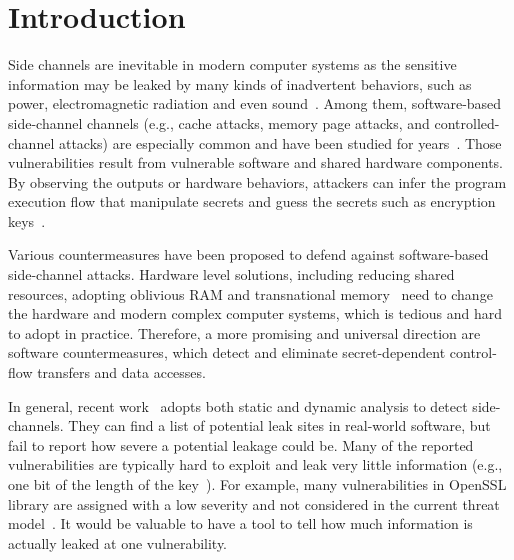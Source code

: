 \section{Introduction}
Side channels are inevitable in modern computer systems as the sensitive information 
may be leaked by many kinds of inadvertent behaviors, 
such as power, electromagnetic radiation and even sound~\cite{}. 
Among them, software-based side-channel channels (e.g., cache attacks, memory page attacks,
and controlled-channel attacks) are especially common 
and have been studied for years~\cite{}. 
Those vulnerabilities result from vulnerable software and shared hardware components.
By observing the outputs or hardware behaviors, attackers can
infer the program execution flow that manipulate secrets and 
guess the secrets such as encryption keys~\cite{}.


Various countermeasures have been proposed to defend against 
software-based side-channel attacks. Hardware level solutions, 
including reducing shared resources, adopting oblivious RAM and 
transnational memory~\cite{182946,203878,217537} need to change the hardware
and modern complex computer systems, which is tedious and hard to adopt in 
practice. Therefore, a more promising and universal direction are software countermeasures, which
detect and eliminate secret-dependent control-flow transfers and data accesses.

In general, recent work~\cite{203878} adopts both static and dynamic analysis
to detect side-channels.
They can find a list of potential leak sites in real-world software, 
but fail to report how severe a potential leakage could be. 
Many of the reported vulnerabilities are typically hard to exploit
and leak very little information (e.g., one bit of the length of the key~\cite{203878}).  
For example, many vulnerabilities in OpenSSL library are assigned with a low severity 
and not considered 
in the current threat model~\cite{https://www.openssl.org/policies/secpolicy.html}. 
It would be valuable to have a tool to tell how much information is actually leaked 
at one vulnerability.

